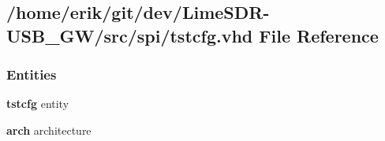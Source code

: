 \subsection{/home/erik/git/dev/\+Lime\+S\+D\+R-\/\+U\+S\+B\+\_\+\+G\+W/src/spi/tstcfg.vhd File Reference}
\label{spi_2tstcfg_8vhd}
\subsubsection*{Entities}
\begin{DoxyCompactItemize}
\item 
{\bf tstcfg} entity
\item 
{\bf arch} architecture
\end{DoxyCompactItemize}
